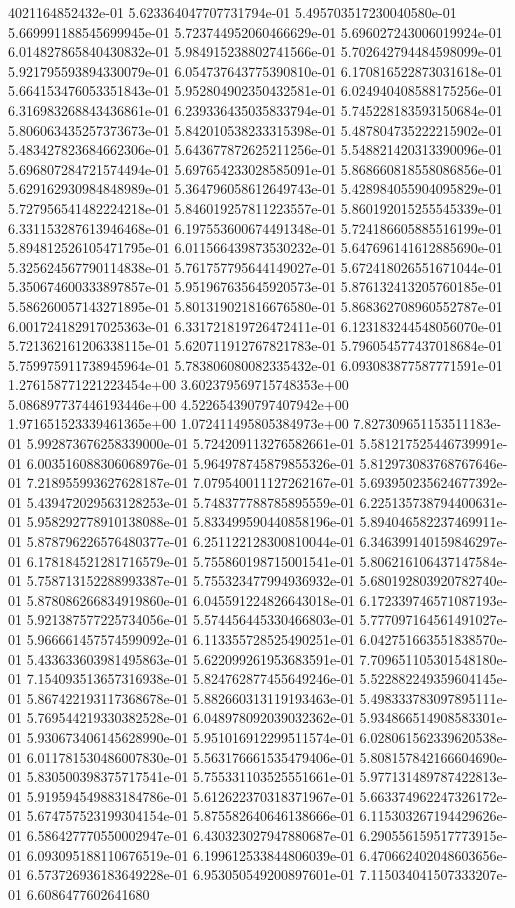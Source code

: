 4021164852432e-01	5.623364047707731794e-01	5.495703517230040580e-01	5.669991188545699945e-01	5.723744952060466629e-01	5.696027243006019924e-01	6.014827865840430832e-01	5.984915238802741566e-01	5.702642794484598099e-01	5.921795593894330079e-01	6.054737643775390810e-01	6.170816522873031618e-01	5.664153476053351843e-01	5.952804902350432581e-01	6.024940408588175256e-01	6.316983268843436861e-01	6.239336435035833794e-01	5.745228183593150684e-01	5.806063435257373673e-01	5.842010538233315398e-01	5.487804735222215902e-01	5.483427823684662306e-01	5.643677872625211256e-01	5.548821420313390096e-01	5.696807284721574494e-01	5.697654233028585091e-01	5.868660818558086856e-01	5.629162930984848989e-01	5.364796058612649743e-01	5.428984055904095829e-01	5.727956541482224218e-01	5.846019257811223557e-01	5.860192015255545339e-01	6.331153287613946468e-01	6.197553600674491348e-01	5.724186605885516199e-01	5.894812526105471795e-01	6.011566439873530232e-01	5.647696141612885690e-01	5.325624567790114838e-01	5.761757795644149027e-01	5.672418026551671044e-01	5.350674600333897857e-01	5.951967635645920573e-01	5.876132413205760185e-01	5.586260057143271895e-01	5.801319021816676580e-01	5.868362708960552787e-01	6.001724182917025363e-01	6.331721819726472411e-01	6.123183244548056070e-01	5.721362161206338115e-01	5.620711912767821783e-01	5.796054577437018684e-01	5.759975911738945964e-01	5.783806080082335432e-01	6.093083877587771591e-01	1.276158771221223454e+00	3.602379569715748353e+00	5.086897737446193446e+00	4.522654390797407942e+00	1.971651523339461365e+00	1.072411495805384973e+00	7.827309651153511183e-01	5.992873676258339000e-01	5.724209113276582661e-01	5.581217525446739991e-01	6.003516088306068976e-01	5.964978745879855326e-01	5.812973083768767646e-01	7.218955993627628187e-01	7.079540011127262167e-01	5.693950235624677392e-01	5.439472029563128253e-01	5.748377788785895559e-01	6.225135738794400631e-01	5.958292778910138088e-01	5.833499590440858196e-01	5.894046582237469911e-01	5.878796226576480377e-01	6.251122128300810044e-01	6.346399140159846297e-01	6.178184521281716579e-01	5.755860198715001541e-01	5.806216106437147584e-01	5.758713152288993387e-01	5.755323477994936932e-01	5.680192803920782740e-01	5.878086266834919860e-01	6.045591224826643018e-01	6.172339746571087193e-01	5.921387577225734056e-01	5.574456445330466803e-01	5.777097164561491027e-01	5.966661457574599092e-01	6.113355728525490251e-01	6.042751663551838570e-01	5.433633603981495863e-01	5.622099261953683591e-01	7.709651105301548180e-01	7.154093513657316938e-01	5.824762877455649246e-01	5.522882249359604145e-01	5.867422193117368678e-01	5.882660313119193463e-01	5.498333783097895111e-01	5.769544219330382528e-01	6.048978092039032362e-01	5.934866514908583301e-01	5.930673406145628990e-01	5.951016912299511574e-01	6.028061562339620538e-01	6.011781530486007830e-01	5.563176661535479406e-01	5.808157842166604690e-01	5.830500398375717541e-01	5.755331103525551661e-01	5.977131489787422813e-01	5.919594549883184786e-01	5.612622370318371967e-01	5.663374962247326172e-01	5.674757523199304154e-01	5.875582640646138666e-01	6.115303267194429626e-01	6.586427770550002947e-01	6.430323027947880687e-01	6.290556159517773915e-01	6.093095188110676519e-01	6.199612533844806039e-01	6.470662402048603656e-01	6.573726936183649228e-01	6.953050549200897601e-01	7.115034041507333207e-01	6.6086477602641680